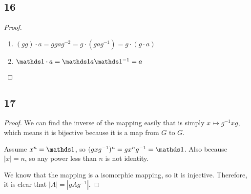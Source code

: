 \subsection*{16}

\begin{proof}
	\begin{enumerate}
		\item $(gg) \cdot a = ggag^{-2} = g \cdot (gag^{-1}) = g \cdot (g \cdot a)$
		\item $\one \cdot a = \one a \one^{-1} = a$
	\end{enumerate}
\end{proof}


\subsection*{17}

\begin{proof}
	We can find the inverse of the mapping easily that is simply $x \mapsto g^{-1}xg$, which means it is bijective because it is a map from $G$ to $G$.

	Assume $x^n=\one$, so $(gxg^{-1})^n = gx^ng^{-1} = \one$.
	Also because $|x|=n$, so any power less than $n$ is not identity.

	We know that the mapping is a isomorphic mapping, so it is injective.
	Therefore, it is clear that $|A|=|gAg^{-1}|$.
	
\end{proof}








